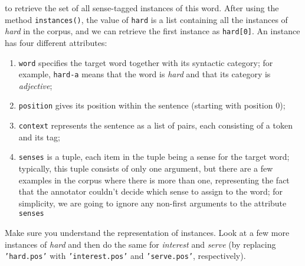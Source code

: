 \documentclass[11pt]{article}
\begin{document}
to retrieve the set of all sense-tagged instances of this word. After using the method {\tt instances()}, the value of {\tt hard} is a list containing all the instances of \emph{hard} in the corpus, and we can retrieve the first instance as {\tt hard[0]}. An instance has
four different attributes:
\begin{enumerate}[topsep=0.2cm,noitemsep]
\item {\tt word} specifies the target word together with its syntactic category; for example,  {\tt hard-a} 
means that the word is {\em hard} and that its category is {\em adjective};
\item {\tt position} gives its position within the sentence (starting with position 0);
\item {\tt context} represents the sentence as a list of pairs, each consisting of a token and its tag; 
\item {\tt senses} is a tuple, each item in the tuple being a sense for the target word; typically, this tuple consists of only one argument, 
but there are a few examples in the corpus where there is more than one, representing the fact that the annotator couldn't decide which sense to assign to the word; for simplicity, we are going to ignore any non-first arguments to the attribute {\tt senses}
\end{enumerate}
Make sure you understand the representation of instances. Look at a few more instances of \emph{hard} and then do 
the same for \emph{interest} and \emph{serve} (by replacing {\tt 'hard.pos'} with {\tt 'interest.pos'} and {\tt 'serve.pos'}, respectively).
\end{document}
